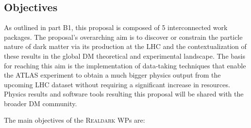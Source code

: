 \subsection{Objectives}
\label{sub:objectives}
\smallskip

As outlined in part B1, this proposal is composed of 5 interconnected work packages. 
The proposal’s overarching aim is to discover or constrain the particle nature of dark matter via its production at the LHC and the contextualization of these results in the global DM theoretical and experimental landscape. 
The basis for reaching this aim is the implementation of data-taking techniques that enable the ATLAS experiment to obtain a much bigger physics output from the upcoming LHC dataset without requiring a significant increase in resources. 
Physics results and software tools resulting this proposal will be shared with the broader DM community. 


The main objectives of the \textsc{Realdark} WPs are: 

